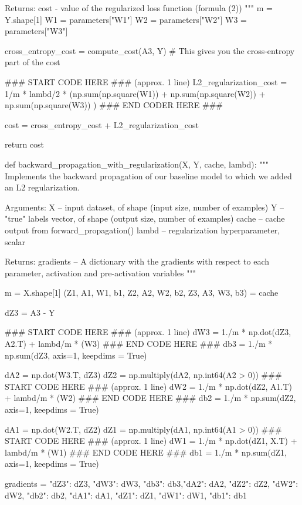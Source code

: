 \documentclass[11pt, onecolumn]{article}
\begin{document}
    Returns:
    cost - value of the regularized loss function (formula (2))
    """
    m = Y.shape[1]
    W1 = parameters["W1"]
    W2 = parameters["W2"]
    W3 = parameters["W3"]
    
    cross_entropy_cost = compute_cost(A3, Y) # This gives you the cross-entropy part of the cost
    
    ### START CODE HERE ### (approx. 1 line)
    L2_regularization_cost = 1/m * lambd/2 * (np.sum(np.square(W1)) + np.sum(np.square(W2)) + np.sum(np.square(W3)) )
    ### END CODER HERE ###
    
    cost = cross_entropy_cost + L2_regularization_cost
    
    return cost
    
def backward_propagation_with_regularization(X, Y, cache, lambd):
    """
    Implements the backward propagation of our baseline model to which we added an L2 regularization.
    
    Arguments:
    X -- input dataset, of shape (input size, number of examples)
    Y -- "true" labels vector, of shape (output size, number of examples)
    cache -- cache output from forward_propagation()
    lambd -- regularization hyperparameter, scalar
    
    Returns:
    gradients -- A dictionary with the gradients with respect to each parameter, activation and pre-activation variables
    """
    
    m = X.shape[1]
    (Z1, A1, W1, b1, Z2, A2, W2, b2, Z3, A3, W3, b3) = cache
    
    dZ3 = A3 - Y
    
    ### START CODE HERE ### (approx. 1 line)
    dW3 = 1./m * np.dot(dZ3, A2.T) + lambd/m * (W3)
    ### END CODE HERE ###
    db3 = 1./m * np.sum(dZ3, axis=1, keepdims = True)
    
    dA2 = np.dot(W3.T, dZ3)
    dZ2 = np.multiply(dA2, np.int64(A2 > 0))
    ### START CODE HERE ### (approx. 1 line)
    dW2 = 1./m * np.dot(dZ2, A1.T) + lambd/m * (W2)
    ### END CODE HERE ###
    db2 = 1./m * np.sum(dZ2, axis=1, keepdims = True)
    
    dA1 = np.dot(W2.T, dZ2)
    dZ1 = np.multiply(dA1, np.int64(A1 > 0))
    ### START CODE HERE ### (approx. 1 line)
    dW1 = 1./m * np.dot(dZ1, X.T) + lambd/m * (W1)
    ### END CODE HERE ###
    db1 = 1./m * np.sum(dZ1, axis=1, keepdims = True)
    
    gradients = {"dZ3": dZ3, "dW3": dW3, "db3": db3,"dA2": dA2,
                 "dZ2": dZ2, "dW2": dW2, "db2": db2, "dA1": dA1, 
                 "dZ1": dZ1, "dW1": dW1, "db1": db1}
    
\end{document}
